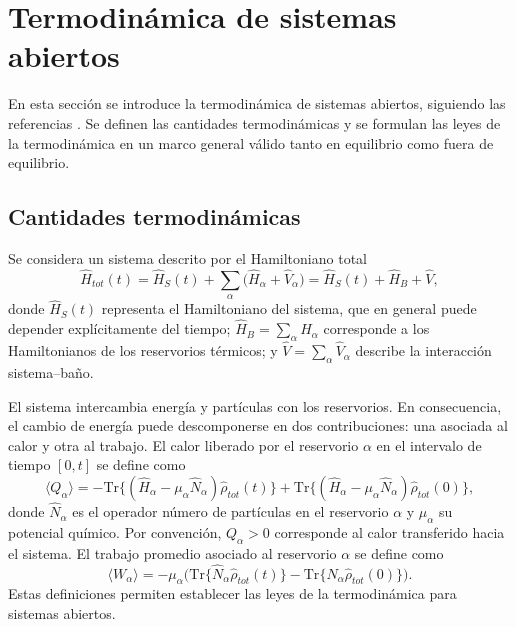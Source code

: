 \label{sec:lindblad}

\section{Termodinámica de sistemas abiertos}
\label{termogeneral}
En esta sección se introduce la termodinámica de sistemas abiertos, siguiendo las referencias \cite{esposito2010entropy,potts2021thermodynamically}. Se definen las cantidades termodinámicas y se formulan las leyes de la termodinámica en un marco general válido tanto en equilibrio como fuera de equilibrio. 

\subsection{Cantidades termodinámicas}
\label{cantidadestermo}
Se considera un sistema descrito por el Hamiltoniano total
\begin{equation*}
    \hat{H}_{tot}(t) = \hat{H}_{S}(t) + \sum_{\alpha}\big(\hat{H}_{\alpha} + \hat{V}_{\alpha}\big)  
    = \hat{H}_{S}(t) + \hat{H}_{B} + \hat{V},
\end{equation*}
donde $\hat{H}_{S}(t)$ representa el Hamiltoniano del sistema, que en general puede depender explícitamente del tiempo; $\hat{H}_{B}=\sum_{\alpha}\hat{H}_{\alpha}$ corresponde a los Hamiltonianos de los reservorios térmicos; y $\hat{V}=\sum_{\alpha}\hat{V}_{\alpha}$ describe la interacción sistema–baño.

El sistema intercambia energía y partículas con los reservorios. En consecuencia, el cambio de energía puede descomponerse en dos contribuciones: una asociada al calor y otra al trabajo. El calor liberado por el reservorio $\alpha$ en el intervalo de tiempo $[0,t]$ se define como
\begin{equation}
    \langle Q_{\alpha}\rangle = - \text{Tr}\{(\hat{H}_{\alpha} - \mu_{\alpha}\hat{N}_{\alpha})\hat{\rho}_{tot}(t) \} 
    + \text{Tr}\{(\hat{H}_{\alpha} - \mu_{\alpha}\hat{N}_{\alpha})\hat{\rho}_{tot}(0) \},
    \label{sec3:calor}
\end{equation}
donde $\hat{N}_{\alpha}$ es el operador número de partículas en el reservorio $\alpha$ y $\mu_{\alpha}$ su potencial químico. Por convención, $Q_{\alpha}>0$ corresponde al calor transferido hacia el sistema. El trabajo promedio asociado al reservorio $\alpha$ se define como
\begin{equation}
    \langle W_{\alpha}\rangle = - \mu_{\alpha} \Big( \text{Tr}\{\hat{N}_{\alpha} \hat{\rho}_{tot}(t) \} - \text{Tr}\{\hat{N}_{\alpha}\hat{\rho}_{tot}(0) \}\Big).
    \label{sec3:trabajo}
\end{equation}
Estas definiciones permiten establecer las leyes de la termodinámica para sistemas abiertos.
\label{Leyestermo}

